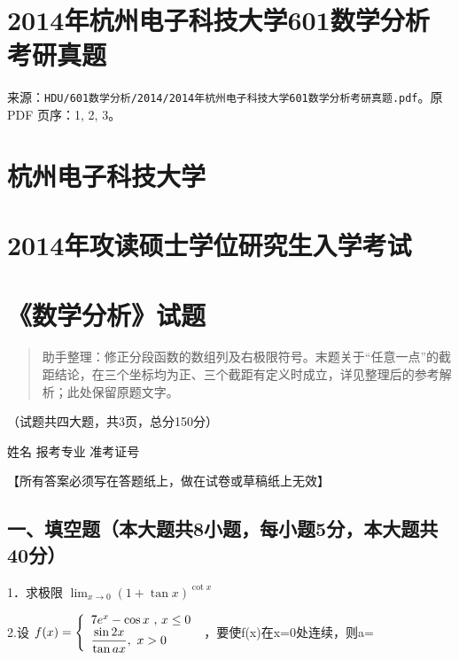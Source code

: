 \documentclass[11pt,fontset=fandol]{ctexart}
\begin{document}
\section{2014年杭州电子科技大学601数学分析考研真题}\label{ux5e74ux676dux5ddeux7535ux5b50ux79d1ux6280ux5927ux5b66601ux6570ux5b66ux5206ux6790ux8003ux7814ux771fux9898}

来源：\texttt{HDU/601数学分析/2014/2014年杭州电子科技大学601数学分析考研真题.pdf}。原
PDF 页序：1, 2, 3。

\section{杭州电子科技大学}\label{ux676dux5ddeux7535ux5b50ux79d1ux6280ux5927ux5b66}

\section{2014年攻读硕士学位研究生入学考试}\label{ux5e74ux653bux8bfbux7855ux58ebux5b66ux4f4dux7814ux7a76ux751fux5165ux5b66ux8003ux8bd5}

\section{《数学分析》试题}\label{ux6570ux5b66ux5206ux6790ux8bd5ux9898}

\begin{quote}
助手整理：修正分段函数的数组列及右极限符号。末题关于``任意一点''的截距结论，在三个坐标均为正、三个截距有定义时成立，详见整理后的参考解析；此处保留原题文字。
\end{quote}

（试题共四大题，共3页，总分150分）

姓名 报考专业 准考证号

【所有答案必须写在答题纸上，做在试卷或草稿纸上无效】

\subsection{一、填空题（本大题共8小题，每小题5分，本大题共40分）}\label{ux4e00ux586bux7a7aux9898ux672cux5927ux9898ux51718ux5c0fux9898ux6bcfux5c0fux98985ux5206ux672cux5927ux9898ux517140ux5206}

1．求极限 \(\lim _ { x \to 0 } ( 1 + \tan x ) ^ { \cot x }\)

2.设
\(f ( x ) = \left\{ \begin{array} { l l } { { 7 e ^ { x } - \cos x \mathrm { ~ , ~ } x \le 0 } } \\ { { \displaystyle { \frac { \sin 2 x } { \tan a x } } , ~ x > 0 } } \end{array} \right.\)
，要使f(x)在x=0处连续，则a=
\end{document}
